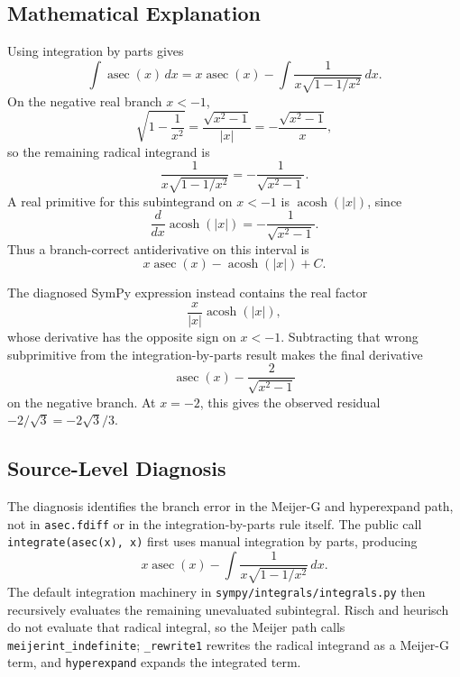 \documentclass[11pt]{article}
\begin{document}
\subsection{Mathematical Explanation}

Using integration by parts gives
\[
  \int \operatorname{asec}(x)\,dx
  = x\operatorname{asec}(x)
    - \int \frac{1}{x\sqrt{1-1/x^2}}\,dx .
\]
On the negative real branch \(x<-1\),
\[
  \sqrt{1-\frac{1}{x^2}}=\frac{\sqrt{x^2-1}}{|x|}
  =-\frac{\sqrt{x^2-1}}{x},
\]
so the remaining radical integrand is
\[
  \frac{1}{x\sqrt{1-1/x^2}}
  =-\frac{1}{\sqrt{x^2-1}}.
\]
A real primitive for this subintegrand on \(x<-1\) is
\(\operatorname{acosh}(|x|)\), since
\[
  \frac{d}{dx}\operatorname{acosh}(|x|)
  =-\frac{1}{\sqrt{x^2-1}}.
\]
Thus a branch-correct antiderivative on this interval is
\[
  x\operatorname{asec}(x)-\operatorname{acosh}(|x|)+C.
\]

The diagnosed SymPy expression instead contains the real factor
\[
  \frac{x}{|x|}\operatorname{acosh}(|x|),
\]
whose derivative has the opposite sign on \(x<-1\).  Subtracting that wrong
subprimitive from the integration-by-parts result makes the final derivative
\[
  \operatorname{asec}(x)-\frac{2}{\sqrt{x^2-1}}
\]
on the negative branch.  At \(x=-2\), this gives the observed residual
\(-2/\sqrt{3}=-2\sqrt{3}/3\).

\subsection{Source-Level Diagnosis}

The diagnosis identifies the branch error in the Meijer-G and hyperexpand path,
not in \texttt{asec.fdiff} or in the integration-by-parts rule itself.  The
public call \texttt{integrate(asec(x), x)} first uses manual integration by
parts, producing
\[
  x\operatorname{asec}(x)
  - \int \frac{1}{x\sqrt{1-1/x^2}}\,dx .
\]
The default integration machinery in
\nolinkurl{sympy/integrals/integrals.py} then recursively evaluates the
remaining unevaluated subintegral.  Risch and heurisch do not evaluate that
radical integral, so the Meijer path calls \texttt{meijerint\_indefinite};
\texttt{\_rewrite1} rewrites the radical integrand as a Meijer-G term, and
\texttt{hyperexpand} expands the integrated term.
\end{document}
